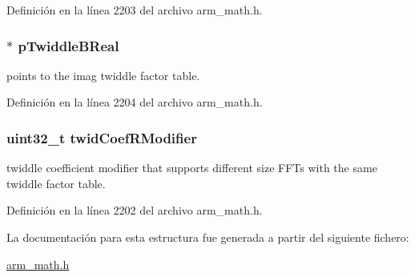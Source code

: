 Definición en la línea 2203 del archivo arm\+\_\+math.\+h.

\subsubsection[{\texorpdfstring{p\+Twiddle\+B\+Real}{pTwiddleBReal}}]{$\ast$ p\+Twiddle\+B\+Real}\hypertarget{structarm__rfft__instance__f32_ab13a458744ac79bb23784351e8002382}{}\label{structarm__rfft__instance__f32_ab13a458744ac79bb23784351e8002382}
points to the imag twiddle factor table. 

Definición en la línea 2204 del archivo arm\+\_\+math.\+h.

\subsubsection[{\texorpdfstring{twid\+Coef\+R\+Modifier}{twidCoefRModifier}}]{\setlength{\rightskip}{0pt plus 5cm}uint32\+\_\+t twid\+Coef\+R\+Modifier}\hypertarget{structarm__rfft__instance__f32_a5b06f7f76c018db993fe6acc5708c589}{}\label{structarm__rfft__instance__f32_a5b06f7f76c018db993fe6acc5708c589}
twiddle coefficient modifier that supports different size F\+F\+Ts with the same twiddle factor table. 

Definición en la línea 2202 del archivo arm\+\_\+math.\+h.



La documentación para esta estructura fue generada a partir del siguiente fichero\+:\begin{DoxyCompactItemize}
\item 
\hyperlink{arm__math_8h}{arm\+\_\+math.\+h}\end{DoxyCompactItemize}
